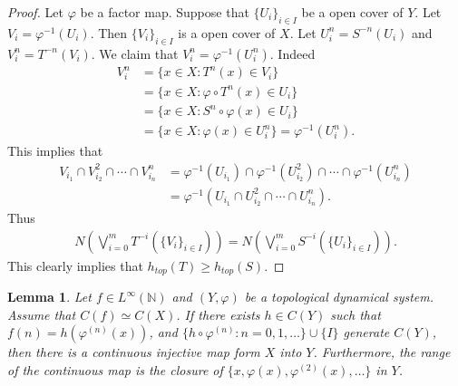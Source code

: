 \documentclass[a4paper,10pt]{amsart}
\newtheorem{lemma}{Lemma}[section]
\newcommand{\N}{\mathbb N} %
\begin{document}
\begin{proof}
    Let $\varphi$ be a factor map.
    Suppose that $\{U_{i}\}_{i \in I}$ be a open cover of $Y$. 
    Let $V_{i} = \varphi^{-1}(U_{i})$. Then $\{V_i\}_{i \in I}$ is
    a open cover of $X$. Let $U^{n}_{i} = S^{-n}(U_{i})$ and
    $V^{n}_{i} = T^{-n}(V_{i})$. We claim that 
    $V^{n}_{i} = \varphi^{-1}(U^{n}_{i})$. Indeed
    \begin{align*}
        V_{i}^{n} &= \{x \in X : T^{n}(x) \in V_{i}\}\\
                  &=\{x \in X : \varphi \circ T^{n}(x) \in U_{i}\}\\
                  &=\{x \in X : S^{n} \circ \varphi (x) \in U_{i}\}\\
                  &=\{x \in X : \varphi(x) \in U_{i}^{n} \} 
                  = \varphi^{-1}(U^{n}_{i}).
    \end{align*}
    This implies that
    \begin{align*}
        V_{i_1}\cap V_{i_2}^{2} \cap \cdots \cap V_{i_n}^{n}
        &= \varphi^{-1}(U_{i_1})\cap \varphi^{-1}(U_{i_2}^{2}) 
        \cap \cdots \cap \varphi^{-1}(U_{i_n}^{n})\\
        &=\varphi^{-1}(
        U_{i_1}\cap U_{i_2}^{2} \cap \cdots \cap U_{i_n}^{n}).
    \end{align*}
    Thus
    \begin{align*}
        N(\bigvee_{i=0}^{m}T^{-i}(\{V_i\}_{i \in I}))
        = N(\bigvee_{i=0}^{m}S^{-i}(\{U_{i}\}_{i \in I})).
    \end{align*}
    This clearly implies that $h_{top}(T) \geq h_{top}(S)$.
\end{proof}


\begin{lemma} \label{w_lam4}
    Let $f \in L^{\infty}(\N)$ and $(Y, \varphi)$ be 
    a topological dynamical system.
    Assume that $C(f) \simeq C(X)$.
    If there exists $h \in C(Y)$ such that $f(n) = h(\varphi^{(n)}(x))$,
    and $\{h\circ \varphi^{(n)} : n = 0, 1, \ldots \} \cup \{I\}$ generate
    $C(Y)$, then there is a continuous injective map form $X$ into $Y$. 
    Furthermore, the range of the continuous map is the closure of 
    $\{x, \varphi(x), \varphi^{(2)}(x), \ldots \}$ in $Y$.
\end{lemma}
\end{document}
